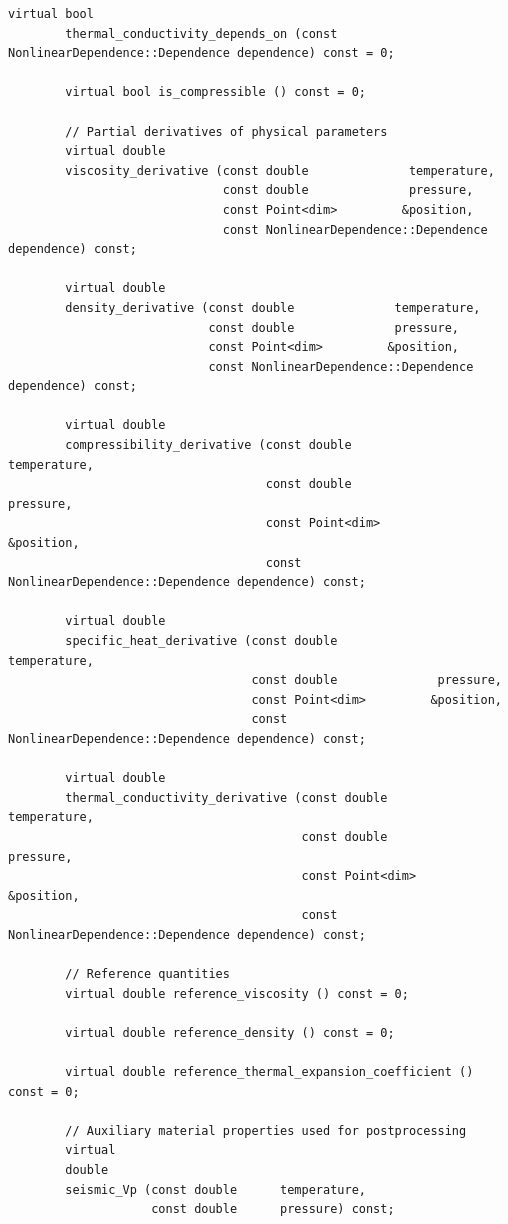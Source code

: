 \documentclass{article}
\begin{document}
\begin{lstlisting}[frame=single]
        virtual bool
        thermal_conductivity_depends_on (const NonlinearDependence::Dependence dependence) const = 0;

        virtual bool is_compressible () const = 0;

        // Partial derivatives of physical parameters
        virtual double
        viscosity_derivative (const double              temperature,
                              const double              pressure,
                              const Point<dim>         &position,
                              const NonlinearDependence::Dependence dependence) const;

        virtual double
        density_derivative (const double              temperature,
                            const double              pressure,
                            const Point<dim>         &position,
                            const NonlinearDependence::Dependence dependence) const;

        virtual double
        compressibility_derivative (const double              temperature,
                                    const double              pressure,
                                    const Point<dim>         &position,
                                    const NonlinearDependence::Dependence dependence) const;

        virtual double
        specific_heat_derivative (const double              temperature,
                                  const double              pressure,
                                  const Point<dim>         &position,
                                  const NonlinearDependence::Dependence dependence) const;

        virtual double
        thermal_conductivity_derivative (const double              temperature,
                                         const double              pressure,
                                         const Point<dim>         &position,
                                         const NonlinearDependence::Dependence dependence) const;

        // Reference quantities
        virtual double reference_viscosity () const = 0;

        virtual double reference_density () const = 0;

        virtual double reference_thermal_expansion_coefficient () const = 0;

        // Auxiliary material properties used for postprocessing
        virtual
        double
        seismic_Vp (const double      temperature,
                    const double      pressure) const;


\end{lstlisting}
\end{document}
